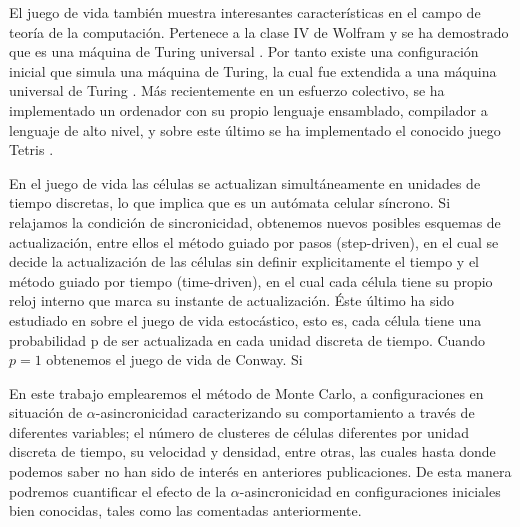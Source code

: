 \documentclass[../proyecto.tex]{book}
\begin{document}
El juego de vida también muestra interesantes características en el campo de teoría de la computación. Pertenece a la clase IV de Wolfram \cite{ccuatro, ccuatro2} y se ha demostrado que es una máquina de Turing universal \cite{turingUniversal}. Por tanto existe una configuración inicial que simula una máquina de Turing, la cual fue extendida a una máquina universal de Turing \cite{turing}. Más recientemente en un esfuerzo colectivo, se ha implementado un ordenador con su propio lenguaje ensamblado, compilador a lenguaje de alto nivel, y sobre este último se ha implementado el conocido juego Tetris \cite{tetris, logical}.

En el juego de vida las células se actualizan simultáneamente en unidades de tiempo discretas, lo que implica que es un autómata celular síncrono. Si relajamos la condición de sincronicidad, obtenemos nuevos posibles esquemas de actualización, entre ellos el método guiado por pasos (step-driven), en el cual se decide la actualización de las células sin definir explicitamente el tiempo y el método guiado por tiempo (time-driven), en el cual cada célula tiene su propio reloj interno que marca su instante de actualización. Éste último ha sido estudiado en \cite{} sobre el juego de vida estocástico, esto es, cada célula tiene una probabilidad p de ser actualizada en cada unidad discreta de tiempo. Cuando $p=1$ obtenemos el juego de vida de Conway. Si 

En este trabajo emplearemos el método de Monte Carlo, a configuraciones en situación de $\alpha$-asincronicidad caracterizando su comportamiento a través de diferentes variables; el número de clusteres de células diferentes por unidad discreta de tiempo, su velocidad y densidad, entre otras, las cuales hasta donde podemos saber no han sido de interés en anteriores publicaciones. De esta manera podremos cuantificar el efecto de la $\alpha$-asincronicidad en configuraciones iniciales bien conocidas, tales como las comentadas anteriormente.
\end{document}
